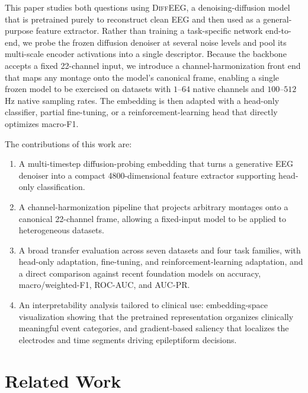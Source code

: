 \documentclass[journal]{IEEEtran}
\begin{document}
This paper studies both questions using \textsc{DiffEEG}, a denoising-diffusion
model that is pretrained purely to reconstruct clean EEG and then used as a
general-purpose feature extractor. Rather than training a task-specific network
end-to-end, we probe the frozen diffusion denoiser at several noise levels and
pool its multi-scale encoder activations into a single descriptor. Because the
backbone accepts a fixed 22-channel input, we introduce a channel-harmonization
front end that maps any montage onto the model's canonical frame, enabling a
single frozen model to be exercised on datasets with $1$--$64$ native channels
and $100$--$512$\,Hz native sampling rates. The embedding is then adapted with a
head-only classifier, partial fine-tuning, or a reinforcement-learning head that
directly optimizes macro-F1.

The contributions of this work are:
\begin{enumerate}
  \item A multi-timestep diffusion-probing embedding that turns a
  generative EEG denoiser into a compact \num{4800}-dimensional feature
  extractor supporting head-only classification.
  \item A channel-harmonization pipeline that projects arbitrary
  montages onto a canonical 22-channel frame, allowing a fixed-input model to be
  applied to heterogeneous datasets.
  \item A broad transfer evaluation across seven datasets and four task
  families, with head-only adaptation, fine-tuning, and reinforcement-learning
  adaptation, and a direct comparison against recent foundation models on
  accuracy, macro/weighted-F1, ROC-AUC, and AUC-PR.
  \item An interpretability analysis tailored to clinical use:
  embedding-space visualization showing that the pretrained representation
  organizes clinically meaningful event categories, and gradient-based saliency
  that localizes the electrodes and time segments driving epileptiform
  decisions.
\end{enumerate}

\section{Related Work}
\end{document}
